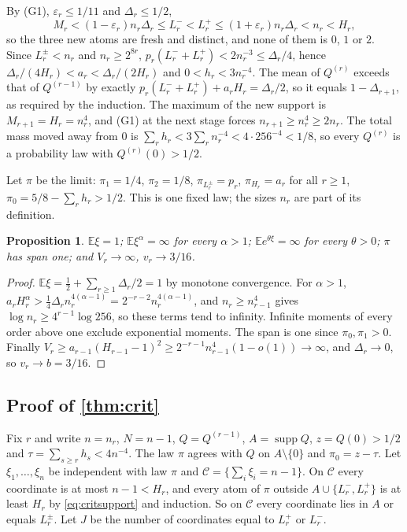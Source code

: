 \documentclass[11pt]{amsart}
\newtheorem{proposition}[theorem]{Proposition}
\theoremstyle{definition}
\newcommand{\E}{\mathbb{E}}
\newcommand{\Cond}{\mathcal{C}}
\DeclareMathOperator{\supp}{supp}
\begin{document}
By (G1), $\varepsilon_r\le1/11$ and $\Delta_r\le1/2$,
\begin{equation}\label{eq:critsupport}
M_r<(1-\varepsilon_r)n_r\Delta_r\le L_r^-<L_r^+\le(1+\varepsilon_r)n_r\Delta_r<n_r<H_r,
\end{equation}
so the three new atoms are fresh and distinct, and none of them is $0$, $1$ or $2$. Since $L_r^\pm<n_r$ and $n_r\ge2^{8r}$, $p_r(L_r^-+L_r^+)<2n_r^{-3}\le\Delta_r/4$, hence $\Delta_r/(4H_r)<a_r<\Delta_r/(2H_r)$ and $0<h_r<3n_r^{-4}$. The mean of $Q^{(r)}$ exceeds that of $Q^{(r-1)}$ by exactly $p_r(L_r^-+L_r^+)+a_rH_r=\Delta_r/2$, so it equals $1-\Delta_{r+1}$, as required by the induction. The maximum of the new support is $M_{r+1}=H_r=n_r^4$, and (G1) at the next stage forces $n_{r+1}\ge n_r^4\ge2n_r$. The total mass moved away from $0$ is $\sum_rh_r<3\sum_rn_r^{-4}<4\cdot256^{-4}<1/8$, so every $Q^{(r)}$ is a probability law with $Q^{(r)}(0)>1/2$.

Let $\pi$ be the limit: $\pi_1=1/4$, $\pi_2=1/8$, $\pi_{L_r^\pm}=p_r$, $\pi_{H_r}=a_r$ for all $r\ge1$, $\pi_0=5/8-\sum_rh_r>1/2$. This is one fixed law; the sizes $n_r$ are part of its definition.

\begin{proposition}\label{prop:crit}
$\E\xi=1$; $\E\xi^\alpha=\infty$ for every $\alpha>1$; $\E e^{\theta\xi}=\infty$ for every $\theta>0$; $\pi$ has span one; and $V_r\to\infty$, $v_r\to3/16$.
\end{proposition}

\begin{proof}
$\E\xi=\tfrac12+\sum_{r\ge1}\Delta_r/2=1$ by monotone convergence. For $\alpha>1$, $a_rH_r^\alpha>\tfrac14\Delta_rn_r^{4(\alpha-1)}=2^{-r-2}n_r^{4(\alpha-1)}$, and $n_r\ge n_{r-1}^4$ gives $\log n_r\ge4^{r-1}\log256$, so these terms tend to infinity. Infinite moments of every order above one exclude exponential moments. The span is one since $\pi_0,\pi_1>0$. Finally $V_r\ge a_{r-1}(H_{r-1}-1)^2\ge2^{-r-1}n_{r-1}^{4}(1-o(1))\to\infty$, and $\Delta_r\to0$, so $v_r\to b=3/16$.
\end{proof}

\subsection{Proof of \texorpdfstring{\cref{thm:crit}}{Theorem 1.2}}

Fix $r$ and write $n=n_r$, $N=n-1$, $Q=Q^{(r-1)}$, $A=\supp Q$, $z=Q(0)>1/2$ and $\tau=\sum_{s\ge r}h_s<4n^{-4}$. The law $\pi$ agrees with $Q$ on $A\setminus\{0\}$ and $\pi_0=z-\tau$. Let $\xi_1,\dots,\xi_n$ be independent with law $\pi$ and $\Cond=\{\sum_i\xi_i=n-1\}$. On $\Cond$ every coordinate is at most $n-1<H_r$, and every atom of $\pi$ outside $A\cup\{L_r^-,L_r^+\}$ is at least $H_r$ by \eqref{eq:critsupport} and induction. So on $\Cond$ every coordinate lies in $A$ or equals $L_r^\pm$. Let $J$ be the number of coordinates equal to $L_r^+$ or $L_r^-$.
\end{document}
